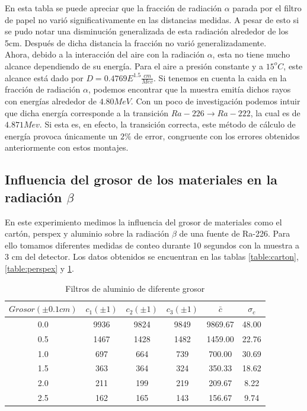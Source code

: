 \documentclass[%
 reprint,
 amsmath,amssymb,
 aps,
]{revtex4-1}
\begin{document}
En esta tabla se puede apreciar que la fracción de radiación $\alpha$ parada por el filtro de papel no varió significativamente en las distancias medidas. A pesar de esto si se pudo notar una disminución generalizada de esta radiación alrededor de los 5cm. Después de dicha distancia la fracción no varió generalizadamente. \\

Ahora, debido a la interacción del aire con la radiación $\alpha$, esta no tiene mucho alcance dependiendo de su energía. Para el aire a presión constante y a $15^oC$, este alcance está dado por $D= 0.4769 E^{1.5}\frac{cm}{Mev}$. Si tenemos en cuenta la caida en la fracción de radiación $\alpha$, podemos encontrar que la muestra emitía dichos rayos con energías alrededor de $4.80 MeV$. Con un poco de investigación \cite{base} podemos intuir que dicha energía corresponde a la transición $Ra-226 \rightarrow Ra-222$, la cual es de $4.871Mev$. Si esta es, en efecto, la transición correcta, este método de cálculo de energía provoca únicamente un $2\%$ de error, congruente con los errores obtenidos anteriormente con estos montajes.\\

\subsection{\label{sec:level2}Influencia del grosor de los materiales en la radiación $\beta$}
En este experimiento medimos la influencia del grosor de materiales como el cartón, perspex y aluminio sobre la radiación $\beta$ de una fuente de Ra-226. Para ello tomamos diferentes medidas de conteo durante 10 segundos con la muestra a 3 cm del detector. Los datos obtenidos se encuentran en las tablas \ref{table:carton}, \ref{table:perspex} y \ref{table:aluminio}.\\

\begin{table}[h!]
\centering
 \begin{tabular}{|c|c|c|c|c|c|} 
 \hline
 $Grosor(\pm0.1cm)$ & $c_1(\pm1)$ & $c_2(\pm1)$ & $c_3(\pm1)$ & $\bar{c}$ & $\sigma_c$ \\ [0.5ex] 
 \hline\hline
 0.0&9936&9824&9849&9869.67&48.00\\
 0.5&1467&1428&1482&1459.00&22.76\\
 1.0&697&664&739&700.00&30.69\\
 1.5&363&364&324&350.33&18.62\\
 2.0&211&199&219&209.67&8.22\\
 2.5&162&165&143&156.67&9.74\\
[1ex] 
 \hline
 \end{tabular}
 \caption{Filtros de aluminio de diferente grosor}
 \label{table:aluminio}
\end{table}
\end{document}
